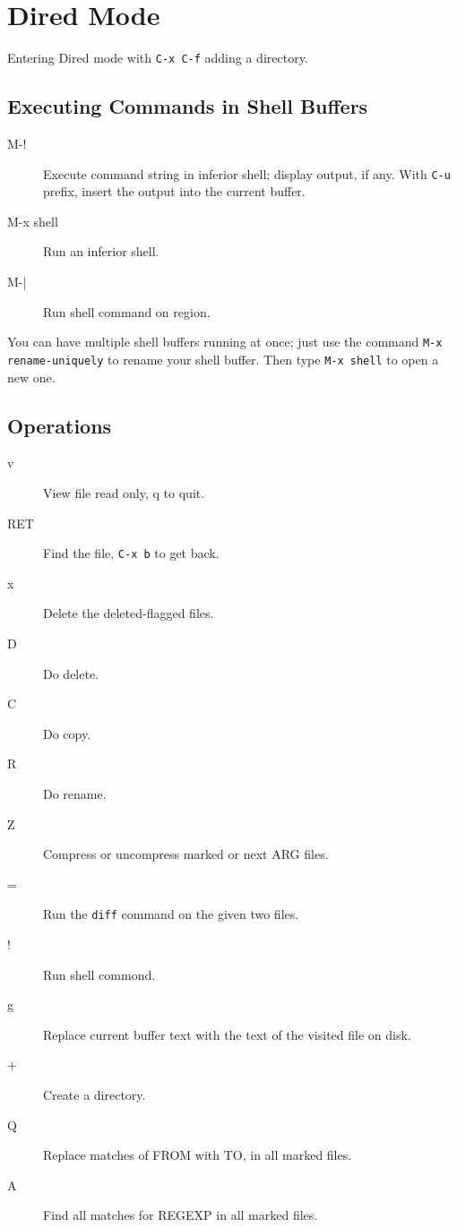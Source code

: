 \chapter{Dired Mode}

Entering Dired mode with \verb|C-x C-f| adding a directory.

\section{Executing Commands in Shell Buffers}

\begin{description}
\item[M-!] Execute command string in inferior shell; display output, if any. With \verb|C-u| prefix, insert the output into the current buffer.
\item[M-x shell] Run an inferior shell.
\item[M-|] Run shell command on region.
\end{description}

You can have multiple shell buffers running at once; just use the command \verb|M-x rename-uniquely| to rename your shell buffer.
Then type \verb|M-x shell| to open a new one.



\section{Operations}
\begin{description}
\item[v] View file read only, q to quit.
\item[RET] Find the file, \verb|C-x b| to get back.
\item[x] Delete the deleted-flagged files.
\item[D] Do delete.
\item[C] Do copy.
\item[R] Do rename.
\item[Z] Compress or uncompress marked or next ARG files.
\item[=] Run the \verb|diff| command on the given two files.
\item[!] Run shell commond.
\item[g] Replace current buffer text with the text of the visited file on disk.
\item[+] Create a directory.
\item[Q] Replace matches of FROM with TO, in all marked files.
\item[A] Find all matches for REGEXP in all marked files.
\end{description}

